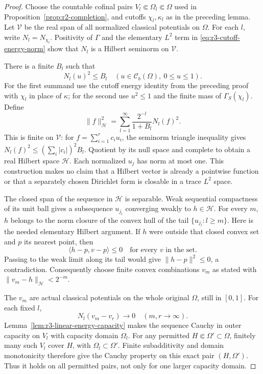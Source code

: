 \documentclass[11pt,a4paper]{article}
\numberwithin{equation}{section}
\theoremstyle{definition}
\theoremstyle{remark}
\newcommand{\Cb}{\mathcal C_b}
\begin{document}
\begin{proof}
Choose the countable cofinal pairs
$V_l\Subset\Omega_l\Subset\Omega$ used in
Proposition~\ref{prop:r2-completion}, and cutoffs
$\chi_l,\kappa_l$ as in the preceding lemma. Let $\mathscr V$
be the real span of all normalized classical potentials on
$\Omega$. For each $l$, write $N_l=N_{\chi_l}$. Positivity of
$\Gamma$ and the elementary $L^2$ term in
\eqref{eq:r3-cutoff-energy-norm} show that $N_l$ is a Hilbert
seminorm on $\mathscr V$.

There is a finite $B_l$ such that
\[
 N_l(u)^2\leq B_l
 \quad(u\in\Cb(\Omega),\ 0\leq u\leq1).
\]
For the first summand use the cutoff energy identity from the
preceding proof with $\chi_l$ in place of $\kappa$; for the
second use $u^2\leq1$ and the finite mass of
$\Gamma_S(\chi_l)$. Define
\begin{equation}
\label{eq:r3-total-hilbert-norm}
 \|f\|_{\mathcal H}^2
   =\sum_{l=1}^{\infty}
          \frac{2^{-l}}{1+B_l}N_l(f)^2.
\end{equation}
This is finite on $\mathscr V$: for
$f=\sum_{i=1}^r c_i u_i$, the seminorm triangle inequality
gives $N_l(f)^2\leq(\sum_i|c_i|)^2 B_l$.
Quotient by its null space and complete to obtain a real Hilbert
space $\mathcal H$. Each normalized $u_j$ has norm at most one.
This construction makes no claim that a Hilbert vector is
already a pointwise function or that a separately chosen
Dirichlet form is closable in a trace $L^2$ space.

The closed span of the sequence in $\mathcal H$ is separable.
Weak sequential compactness of its unit ball gives a subsequence
$u_{j_l}$ converging weakly to $h\in\mathcal H$. For every
$m$, $h$ belongs to the norm closure of the convex hull of the
tail $\{u_{j_l}:l\geq m\}$. Here is the needed elementary
Hilbert argument. If $h$ were outside that closed convex set and
$p$ its nearest point, then
\[
 \langle h-p,v-p\rangle\leq0
 \quad\text{for every }v\text{ in the set}.
\]
Passing to the weak limit along its tail would give
$\|h-p\|^2\leq0$, a contradiction.
Consequently choose finite convex combinations $v_m$ as stated
with $\|v_m-h\|_{\mathcal H}<2^{-m}$.

The $v_m$ are actual classical potentials on the whole original
$\Omega$, still in $[0,1]$. For each fixed $l$,
\[
 N_l(v_m-v_r)\longrightarrow0\quad(m,r\to\infty).
\]
Lemma~\ref{lem:r3-linear-energy-capacity} makes the sequence
Cauchy in outer capacity on $V_l$ with capacity domain
$\Omega_l$. For any permitted $H\Subset\Omega'\subset\Omega$,
finitely many such $V_l$ cover $H$, with $\Omega_l\subset\Omega'$.
Finite subadditivity and domain monotonicity therefore give the
Cauchy property on this exact pair $(H,\Omega')$. Thus it holds
on all permitted pairs, not only for one larger capacity domain.


\end{proof}
\end{document}
